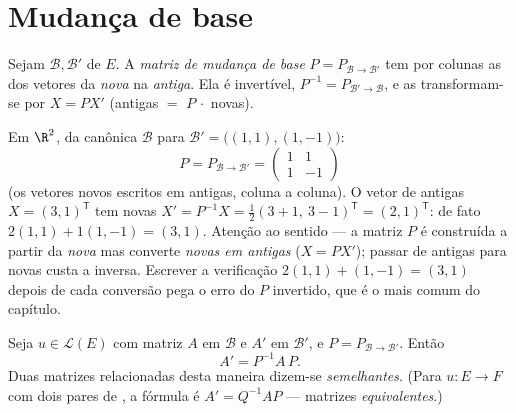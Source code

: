 \section{Mudança de base}

\begin{definition}\label{def:b1:matrices:changeofbasis}
Sejam $\mathcal{B}, \mathcal{B}'$  de $E$. A \emph{matriz de mudança de
base} $P =
P_{\mathcal{B}\to\mathcal{B}'}$ tem por colunas as 
dos vetores da \emph{nova}  na  \emph{antiga}. Ela é
invertível, $P^{-1} = P_{\mathcal{B}'\to\mathcal{B}}$, e as  transformam-se por $X = PX'$
(antigas $=$ $P\,\cdot$ novas).
\end{definition}

\begin{example}
\label{ex:b1:matrices:changerun}
Em $\R^2$, da  canônica $\mathcal B$ para $\mathcal B' =
\bigl((1,1), (1,-1)\bigr)$:
\[
P = P_{\mathcal B\to\mathcal B'} =
\begin{pmatrix} 1 & 1\\ 1 & -1 \end{pmatrix}
\]
(os vetores novos escritos em  antigas, coluna a
coluna). O vetor de  antigas $X = (3, 1)^{\mathsf T}$ tem  novas
$X' = P^{-1}X = \frac12(3 + 1,\ 3 - 1)^{\mathsf T} =
(2, 1)^{\mathsf T}$: de fato $2(1,1) + 1(1,-1) = (3,1)$. Atenção ao sentido --- a matriz $P$ é
construída a partir da  \emph{nova} mas converte 
\emph{novas em antigas} ($X = PX'$); passar de antigas para novas
custa a inversa. Escrever a verificação $2(1,1) + (1,-1) = (3,1)$ depois de cada
conversão pega o erro do $P$ invertido, que é o mais comum do
capítulo.
\end{example}

\begin{theorem}\label{thm:b1:matrices:conjugation}
Seja $u \in \mathcal{L}(E)$ com matriz $A$ em $\mathcal{B}$ e $A'$ em $\mathcal{B}'$, e $P = P_{\mathcal{B}\to\mathcal{B}'}$. Então
\[
A' = P^{-1} A\, P .
\]
Duas matrizes relacionadas desta maneira dizem-se
\emph{semelhantes}. (Para $u \colon E \to F$ com dois
pares de , a fórmula é $A' = Q^{-1} A P$ --- matrizes
\emph{equivalentes}.)
\end{theorem}

